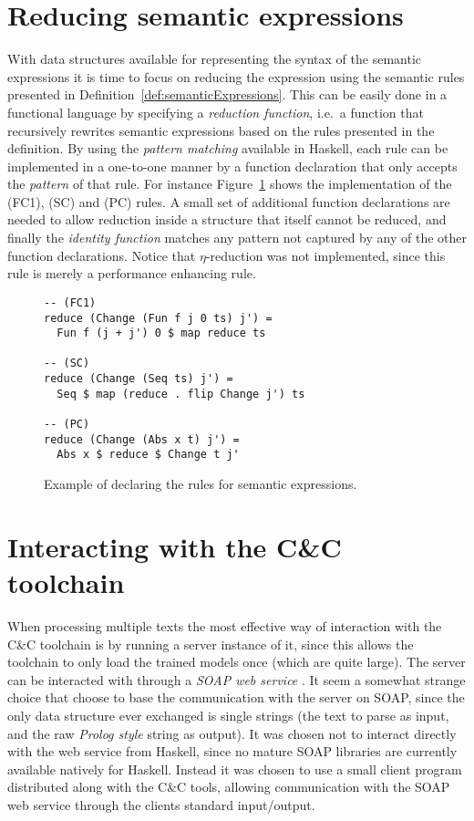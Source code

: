 \section{Reducing semantic expressions}

With data structures available for representing the syntax of the semantic expressions it is time to focus on reducing the expression using the semantic rules presented in Definition~\ref{def:semanticExpressions}. This can be easily done in a functional language by specifying a \emph{reduction function}, i.e.\ a function that recursively rewrites semantic expressions based on the rules presented in the definition. By using the \emph{pattern matching} available in Haskell, each rule can be implemented in a one-to-one manner by a function declaration that only accepts the \emph{pattern} of that rule. For instance Figure~\ref{fig:reduce} shows the implementation of the (FC1), (SC) and (PC) rules. A small set of additional function declarations are needed to allow reduction inside a structure that itself cannot be reduced, and finally the \emph{identity function} matches any pattern not captured by any of the other function declarations. Notice that $\eta$-reduction was not implemented, since this rule is merely a performance enhancing rule.
\begin{figure}[ht]
\begin{cframed}{.9\textwidth}
\vspace{-8pt}
\begin{lstlisting}[language=GHC]
-- (FC1)
reduce (Change (Fun f j 0 ts) j') = 
  Fun f (j + j') 0 $ map reduce ts

-- (SC)
reduce (Change (Seq ts) j') = 
  Seq $ map (reduce . flip Change j') ts

-- (PC)
reduce (Change (Abs x t) j') = 
  Abs x $ reduce $ Change t j'
\end{lstlisting}	
\end{cframed}
\caption{Example of declaring the rules for semantic expressions.}
\label{fig:reduce}
\end{figure}
\vspace{-1em}

\section{Interacting with the C\&C toolchain}
When processing multiple texts the most effective way of interaction with the C\&C toolchain is by running a server instance of it, since this allows the toolchain to only load the trained models once (which are quite large). The server can be interacted with through a \emph{SOAP web service} \cite{soap}. It seem a somewhat strange choice that \citeauthor{candc} choose to base the communication with the server on SOAP, since the only data structure ever exchanged is single strings (the text to parse as input, and the raw \emph{Prolog style} string as output). It was chosen not to interact directly with the web service from Haskell, since no mature SOAP libraries are currently available natively for Haskell. Instead it was chosen to use a small client program distributed along with the C\&C tools, allowing communication with the SOAP web service through the clients standard input/output.

